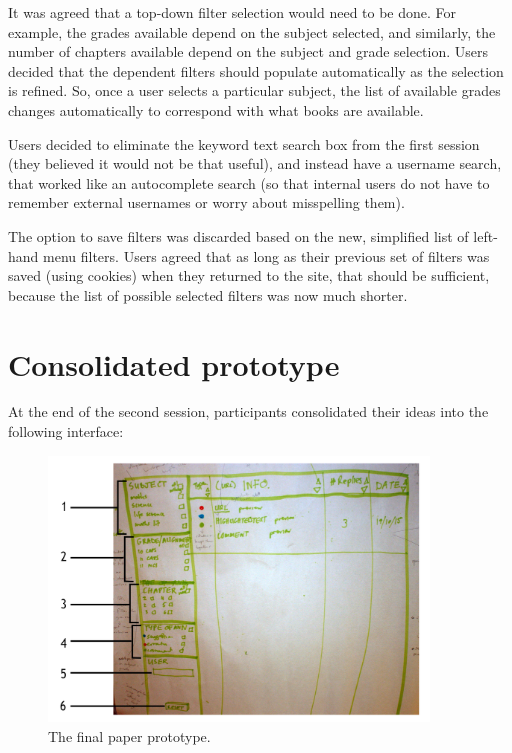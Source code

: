 It was agreed that a top-down filter selection would need to be done. For example, the grades available depend on the subject selected, and similarly, the number of chapters available depend on the subject and grade selection. Users decided that the dependent filters should populate automatically as the selection is refined. So, once a user selects a particular subject, the list of available grades changes automatically to correspond with what books are available. 

Users decided to eliminate the keyword text search box from the first session (they believed it would not be that useful), and instead have a username search, that worked like an autocomplete search (so that internal users do not have to remember external usernames or worry about misspelling them). 

The option to save filters was discarded based on the new, simplified list of left-hand menu filters. Users agreed that as long as their previous set of filters was saved (using cookies) when they returned to the site, that should be sufficient, because the list of possible selected filters was now much shorter. 

\section{Consolidated prototype}
At the end of the second session, participants consolidated their ideas into the following interface:
\begin{figure}[h!]
    \centering
    \includegraphics[width=0.9\textwidth]{Figures/PDFinalLabels.png}
 \caption{The final paper prototype.}
 \label{fig:FinalPP}
\end{figure}

